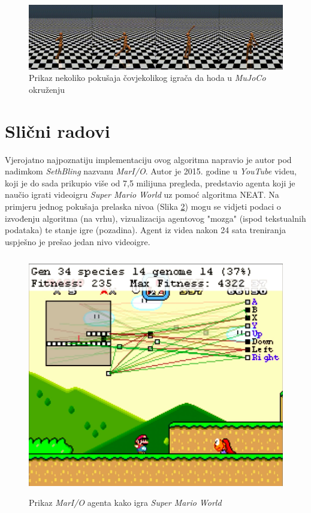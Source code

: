 \documentclass[times, utf8, diplomski, numeric]{fer}
\begin{document}
\begin{figure}
  \includegraphics[width=\textwidth]{slika1}
  \caption{Prikaz nekoliko pokušaja čovjekolikog igrača da hoda u \textit{MuJoCo} okruženju}
  \label{slika1}
\end{figure}

\section{Slični radovi}
Vjerojatno najpoznatiju implementaciju ovog algoritma napravio je autor pod nadimkom \textit{SethBling} nazvanu \textit{MarI/O}. Autor je 2015. godine u \textit{YouTube} videu, koji je do sada prikupio više od 7,5 milijuna pregleda, predstavio agenta koji je naučio igrati videoigru \textit{Super Mario World} uz pomoć algoritma NEAT. Na primjeru jednog pokušaja prelaska nivoa (Slika \ref{slika2}) mogu se vidjeti podaci o izvođenju algoritma (na vrhu), vizualizacija agentovog "mozga" (ispod tekstualnih podataka) te stanje igre (pozadina). Agent iz videa nakon 24 sata treniranja uspješno je prešao jedan nivo videoigre.

\begin{figure}
  \centering
  \includegraphics[height=10.5cm]{slika2}
  \caption{Prikaz \textit{MarI/O} agenta kako igra \textit{Super Mario World}}
  \label{slika2}
\end{figure}
\end{document}
